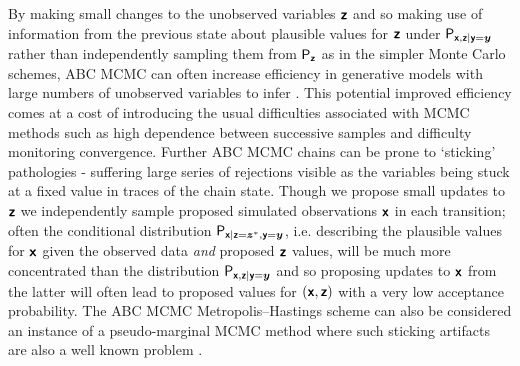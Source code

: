 By making small changes to the unobserved variables $\boldsymbol{\mathsf{z}}$ and so making use of information from the previous state about plausible values for $\boldsymbol{\mathsf{z}}$ under $\mathsf{P}_{\boldsymbol{\mathsf{x}},\boldsymbol{\mathsf{z}}|\boldsymbol{\mathsf{y}}=\boldsymbol{y}}$ rather than independently sampling them from $\mathsf{P}_{\boldsymbol{\mathsf{z}}}$ as in the simpler Monte Carlo schemes, \ac{ABC} \ac{MCMC} can often increase efficiency in generative models with large numbers of unobserved variables to infer \cite{sisson2011likelihood}. This potential improved efficiency comes at a cost of introducing the usual difficulties associated with \ac{MCMC} methods such as high dependence between successive samples and difficulty monitoring convergence. Further \ac{ABC} \ac{MCMC} chains can be prone to `sticking' pathologies - suffering large series of rejections visible as the variables being stuck at a fixed value in traces of the chain state. Though we propose small updates to $\boldsymbol{\mathsf{z}}$ we independently sample proposed simulated observations $\boldsymbol{\mathsf{x}}$ in each transition; often the conditional distribution $\mathsf{P}_{\boldsymbol{\mathsf{x}}|\boldsymbol{\mathsf{z}}=\boldsymbol{z}^*,\boldsymbol{\mathsf{y}}=\boldsymbol{y}}$, i.e. describing the plausible values for $\boldsymbol{\mathsf{x}}$ given the observed data \emph{and} proposed $\boldsymbol{\mathsf{z}}$ values, will be much more concentrated than the distribution $\mathsf{P}_{\boldsymbol{\mathsf{x}},\boldsymbol{\mathsf{z}}|\boldsymbol{\mathsf{y}}=\boldsymbol{y}}$ and so proposing updates to $\boldsymbol{\mathsf{x}}$ from the latter will often lead to proposed values for $(\boldsymbol{\mathsf{x}},\boldsymbol{\mathsf{z}})$ with a very low acceptance probability.
The \ac{ABC} \ac{MCMC} Metropolis--Hastings scheme can also be considered an instance of a pseudo-marginal \ac{MCMC} method \citep{beaumont2002approximate,andrieu2009pseudo} where such sticking artifacts are also a well known problem \citep{murray2010slice}. %



